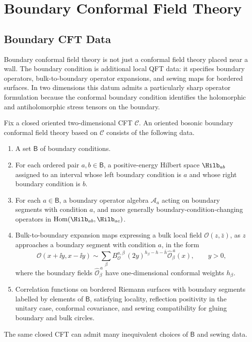 \chapter{Boundary Conformal Field Theory}
\label{ch:boundary-conformal-field-theory}

\ConventionsEuclideanCFT

\section{Boundary CFT Data}

Boundary conformal field theory is not just a conformal field theory placed
near a wall.  The boundary condition is additional local QFT data: it
specifies boundary operators, bulk-to-boundary operator expansions, and
sewing maps for bordered surfaces.  In two dimensions this datum admits a
particularly sharp operator formulation because the conformal boundary
condition identifies the holomorphic and antiholomorphic stress tensors on
the boundary.

\begin{definition}
\label{def:oriented-bosonic-bcft-datum}
Fix a closed oriented two-dimensional CFT \(\mathcal C\).  An oriented
bosonic boundary conformal field theory based on \(\mathcal C\) consists of
the following data.
\begin{enumerate}
\item A set \(\mathsf B\) of boundary conditions.
\item For each ordered pair \(a,b\in\mathsf B\), a positive-energy Hilbert
space \(\Hilb_{ab}\) assigned to an interval whose left boundary condition is
\(a\) and whose right boundary condition is \(b\).
\item For each \(a\in\mathsf B\), a boundary operator algebra
\(\mathcal A_a\) acting on boundary segments with condition \(a\), and more
generally boundary-condition-changing operators in
\(\operatorname{Hom}(\Hilb_{ab},\Hilb_{ac})\).
\item Bulk-to-boundary expansion maps expressing a bulk local field
\(\mathcal O(z,\bar z)\), as \(z\) approaches a boundary segment with
condition \(a\), in the form
\begin{equation}
  \mathcal O(x+\ii y,x-\ii y)
  \sim
  \sum_{\beta}
  B_{\mathcal O}^{a,\beta}\,
  (2y)^{h_\beta-h-\bar h}
  \widehat{\mathcal O}^{\,a}_\beta(x),
  \qquad y>0,
  \label{eq:bcft-bulk-boundary-ope}
\end{equation}
where the boundary fields \(\widehat{\mathcal O}^{\,a}_\beta\) have
one-dimensional conformal weights \(h_\beta\).
\item Correlation functions on bordered Riemann surfaces with boundary
segments labelled by elements of \(\mathsf B\), satisfying locality,
reflection positivity in the unitary case, conformal covariance, and sewing
compatibility for gluing boundary and bulk circles.
\end{enumerate}
The same closed CFT can admit many inequivalent choices of \(\mathsf B\) and
sewing data.
\end{definition}

